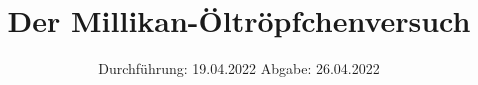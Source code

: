 

\subject{VERSUCH NUMMER 503}
\title{Der Millikan-Öltröpfchenversuch}
\date{%
  Durchführung: 19.04.2022
  \hspace{3em}
  Abgabe: 26.04.2022
}



\maketitle
\thispagestyle{empty}
\tableofcontents
\newpage






\printbibliography{}


